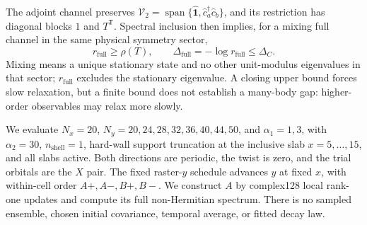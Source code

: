 \documentclass[aps,prb,onecolumn,nofootinbib,superscriptaddress]{revtex4-2}
\begin{document}
The adjoint channel preserves
$\mathcal V_2=\operatorname{span}\{\hat{\mathbf{1}},\hat c_a^\dagger\hat c_b\}$,
and its restriction has diagonal blocks $1$ and $T^{\mathsf T}$.
Spectral inclusion then implies, for a mixing full channel in the same
physical symmetry sector,
\begin{equation}
 r_{\mathrm{full}}\geq\rho(T),\qquad
 \Delta_{\mathrm{full}}=-\log r_{\mathrm{full}}\leq\Delta_C.
\end{equation}
Mixing means a unique stationary state and no other unit-modulus eigenvalues
in that sector; $r_{\mathrm{full}}$ excludes the stationary eigenvalue. A closing upper
bound forces slow relaxation, but a finite bound does not establish a
many-body gap: higher-order observables may relax more slowly.

We evaluate $N_x=20$, $N_y=20,24,28,32,36,40,44,50$, and $\alpha_1=1,3$,
with $\alpha_2=30$, $n_{\mathrm{shell}}=1$, hard-wall support truncation at
the inclusive slab $x=5,\ldots,15$, and all slabs active. Both directions
are periodic, the twist is zero, and the trial orbitals are the $X$ pair.
The fixed raster-$y$ schedule advances $y$ at fixed $x$, with within-cell
order $A+,A-,B+,B-$. We construct $A$ by complex128 local rank-one updates
and compute its full non-Hermitian spectrum. There is no sampled ensemble,
chosen initial covariance, temporal average, or fitted decay law.

\end{document}
